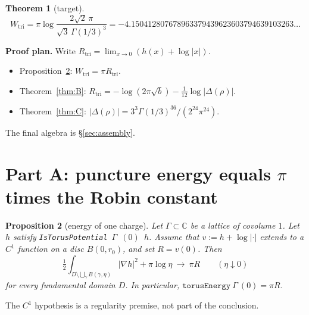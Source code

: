 \documentclass[11pt]{article}
\newtheorem{theorem}{Theorem}[section]
\newtheorem{proposition}[theorem]{Proposition}
\theoremstyle{definition}
\theoremstyle{remark}
\newcommand{\C}{\mathbb C}
\newcommand{\lean}[1]{\texttt{#1}}
\begin{document}
\begin{theorem}[target]\label{thm:target}
\[
 W_{\mathrm{tri}}=\pi\log\frac{2\sqrt2\,\pi}{\sqrt3\,\Gamma(1/3)^3}=-4.150412807678963379439623603794639103263\dots
\]
\end{theorem}

\noindent\textbf{Proof plan.} Write $R_{\mathrm{tri}}=\lim_{x\to0}(h(x)+\log|x|)$.
\begin{itemize}
\item Proposition~\ref{prop:A}: $W_{\mathrm{tri}}=\pi R_{\mathrm{tri}}$.
\item Theorem~\ref{thm:B}: $R_{\mathrm{tri}}=-\log(2\pi\sqrt b)-\tfrac1{12}\log|\Delta(\rho)|$.
\item Theorem~\ref{thm:C}: $|\Delta(\rho)|=3^3\Gamma(1/3)^{36}/(2^{24}\pi^{24})$.
\end{itemize}
The final algebra is \S\ref{sec:assembly}.

\section{Part A: puncture energy equals $\pi$ times the Robin constant}

\begin{proposition}[energy of one charge]\label{prop:A}
Let $\Gamma\subset\C$ be a lattice of covolume $1$. Let $h$ satisfy \lean{IsTorusPotential}\ $\Gamma$\ $(0)$\ $h$.
Assume that $v:=h+\log|\cdot|$ extends to a $C^1$ function on a disc $B(0,r_0)$, and set $R=v(0)$. Then
\[
 \tfrac12\int_{D\setminus\bigcup_{\gamma}B(\gamma,\eta)}|\nabla h|^2+\pi\log\eta\ \longrightarrow\ \pi R
 \qquad(\eta\downarrow0)
\]
for every fundamental domain $D$. In particular, $\lean{torusEnergy}\ \Gamma\ (0)=\pi R$.
\end{proposition}

\noindent The $C^1$ hypothesis is a regularity premise, not part of the conclusion.
\end{document}
